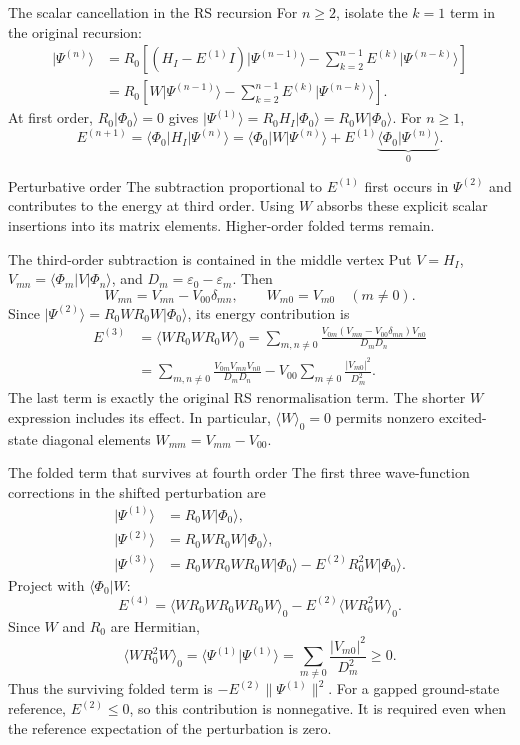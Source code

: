 \documentclass[aspectratio=169,10pt]{beamer}
\newcommand{\ket}[1]{\vert #1\rangle}
\newcommand{\bra}[1]{\langle #1\vert}
\newcommand{\braket}[2]{\langle #1\vert #2\rangle}
\newcommand{\mel}[3]{\langle #1\lvert #2\rvert #3\rangle}
\newcommand{\av}[1]{\langle #1\rangle_0}
\newcommand{\ph}{\Phi_0}
\begin{document}
\begin{frame}{The scalar cancellation in the RS recursion}
For $n\ge2$, isolate the $k=1$ term in the original recursion:
\begin{align*}
 \ket{\Psi^{(n)}}
 &=R_0\left[(H_I-E^{(1)}I)\ket{\Psi^{(n-1)}}
       -\sum_{k=2}^{n-1}E^{(k)}\ket{\Psi^{(n-k)}}\right]\\
 &=R_0\left[W\ket{\Psi^{(n-1)}}
       -\sum_{k=2}^{n-1}E^{(k)}\ket{\Psi^{(n-k)}}\right].
\end{align*}
At first order, $R_0\ket{\ph}=0$ gives $\ket{\Psi^{(1)}}=R_0H_I\ket{\ph}=R_0W\ket{\ph}$. For $n\ge1$,
\[
 E^{(n+1)}=\mel{\ph}{H_I}{\Psi^{(n)}}
 =\mel{\ph}{W}{\Psi^{(n)}}+E^{(1)}\underbrace{\braket{\ph}{\Psi^{(n)}}}_{0}.
\]
\begin{block}{Perturbative order}
The subtraction proportional to $E^{(1)}$ first occurs in $\Psi^{(2)}$ and contributes to the energy at third order. Using $W$ absorbs these explicit scalar insertions into its matrix elements. Higher-order folded terms remain.
\end{block}
\end{frame}

\begin{frame}{The third-order subtraction is contained in the middle vertex}
Put $V=H_I$, $V_{mn}=\mel{\Phi_m}{V}{\Phi_n}$, and $D_m=\varepsilon_0-\varepsilon_m$. Then
\[
 W_{mn}=V_{mn}-V_{00}\delta_{mn},\qquad
 W_{m0}=V_{m0}\quad(m\ne0).
\]
Since $\ket{\Psi^{(2)}}=R_0WR_0W\ket{\ph}$, its energy contribution is
\begin{align*}
 E^{(3)}&=\av{WR_0WR_0W}
       =\sum_{m,n\ne0}\frac{V_{0m}(V_{mn}-V_{00}\delta_{mn})V_{n0}}{D_mD_n}\\
 &=\sum_{m,n\ne0}\frac{V_{0m}V_{mn}V_{n0}}{D_mD_n}
      -V_{00}\sum_{m\ne0}\frac{|V_{m0}|^2}{D_m^2}.
\end{align*}
The last term is exactly the original RS renormalisation term. The shorter $W$ expression includes its effect. In particular, $\av{W}=0$ permits nonzero excited-state diagonal elements $W_{mm}=V_{mm}-V_{00}$.
\end{frame}

\begin{frame}{The folded term that survives at fourth order}
The first three wave-function corrections in the shifted perturbation are
\begin{align*}
 \ket{\Psi^{(1)}}&=R_0W\ket{\ph},\\
 \ket{\Psi^{(2)}}&=R_0WR_0W\ket{\ph},\\
 \ket{\Psi^{(3)}}&=R_0WR_0WR_0W\ket{\ph}-E^{(2)}R_0^2W\ket{\ph}.
\end{align*}
Project with $\bra{\ph}W$:
\[
 \boxed{E^{(4)}=\av{WR_0WR_0WR_0W}-E^{(2)}\av{WR_0^2W}.}
\]
Since $W$ and $R_0$ are Hermitian,
\[
 \av{WR_0^2W}=\braket{\Psi^{(1)}}{\Psi^{(1)}}
 =\sum_{m\ne0}\frac{|V_{m0}|^2}{D_m^2}\ge0.
\]
Thus the surviving folded term is $-E^{(2)}\|\Psi^{(1)}\|^2$. For a gapped ground-state reference, $E^{(2)}\le0$, so this contribution is nonnegative. It is required even when the reference expectation of the perturbation is zero.
\end{frame}
\end{document}
